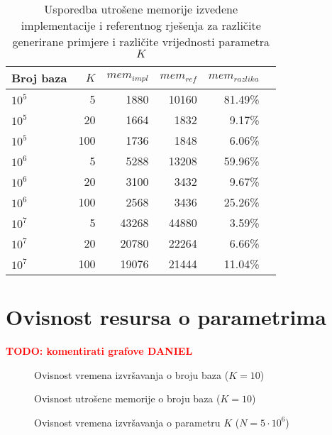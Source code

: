 \documentclass[times, utf8, seminar, numeric]{fer}
\newcommand\todo[1]{\textbf{\textcolor{red}{TODO: #1}}}
\begin{document}
\begin{table}[h]
	\centering
	\caption{Usporedba utrošene memorije izvedene implementacije i referentnog rješenja za različite generirane primjere i različite vrijednosti parametra $K$}
	\label{tbl:memory-generated}
	
	\begin{tabular}{lrrrrr}
		\hline
        Broj baza & $K$ & $mem_{impl}$ & $mem_{ref}$ & $mem_{razlika}$ \\ \hline
        $10^5$ & 5 & 1880 & 10160 & 81.49\% \\
        $10^5$ & 20 & 1664 & 1832 & 9.17\% \\
        $10^5$ & 100 & 1736 & 1848 & 6.06\% \\ \hline
        $10^6$ & 5 & 5288 & 13208 & 59.96\% \\
        $10^6$ & 20 & 3100 & 3432 & 9.67\% \\
        $10^6$ & 100 & 2568 & 3436 & 25.26\% \\ \hline
        $10^7$ & 5 & 43268 & 44880 & 3.59\% \\
        $10^7$ & 20 & 20780 & 22264 & 6.66\% \\
        $10^7$ & 100 & 19076 & 21444 & 11.04\% \\
    \hline
	\end{tabular}
\end{table}

\section{Ovisnost resursa o parametrima}
\todo{komentirati grafove DANIEL} \\

\begin{figure}[!h]
	\centering
	\def\svgwidth{.7\columnwidth}
	
  \caption{Ovisnost vremena izvršavanja o broju baza ($K = 10$)}
\end{figure}

\begin{figure}[!h]
	\centering
	\def\svgwidth{.7\columnwidth}
	
  \caption{Ovisnost utrošene memorije o broju baza ($K = 10$)}
\end{figure}

\begin{figure}[!h]
	\centering
	\def\svgwidth{.7\columnwidth}
	
  \caption{Ovisnost vremena izvršavanja o parametru $K$ ($N = 5 \cdot 10^6$)}
\end{figure}
\end{document}
